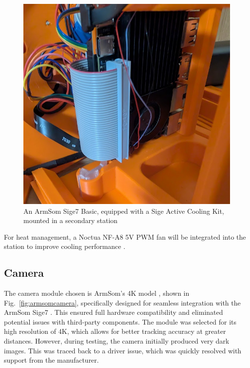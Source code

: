 \begin{figure}[H]
	\centering
	\includegraphics[width=1.0\linewidth]{figures/armsom_sige7}
	\caption{An ArmSom Sige7 Basic, equipped with a Sige Active Cooling Kit, mounted in a secondary station}
	\label{fig:armsomsige7}
\end{figure}

For heat management, a Noctua NF-A8 5V PWM fan will be integrated into the station to improve cooling performance \cite{noctua_fan_nf_a8}.

\subsection{Camera}

The camera module chosen is ArmSom's 4K model \cite{armsom_camera_module}, shown in Fig.~\ref{fig:armsomcamera}, specifically designed for seamless integration with the ArmSom Sige7 \cite{armsom_sige7}. This ensured full hardware compatibility and eliminated potential issues with third-party components. The module was selected for its high resolution of 4K, which allows for better tracking accuracy at greater distances. However, during testing, the camera initially produced very dark images. This was traced back to a driver issue, which was quickly resolved with support from the manufacturer.

